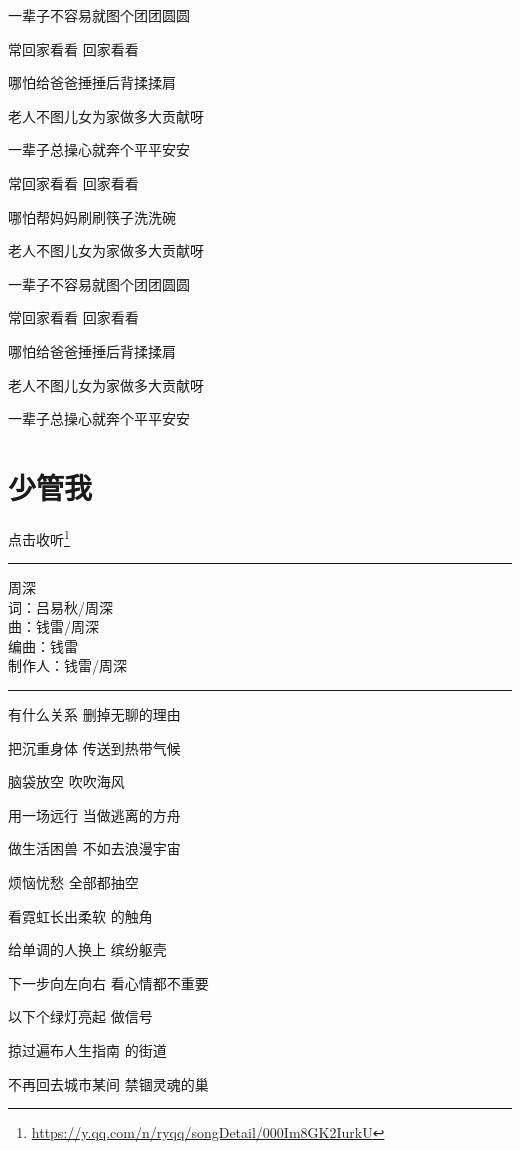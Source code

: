 \documentclass[]{ctexbook}
\renewcommand{\href}[2]{#2\footnote{\url{#1}}}
\begin{document}
一辈子不容易就图个团团圆圆

常回家看看 回家看看

哪怕给爸爸捶捶后背揉揉肩

老人不图儿女为家做多大贡献呀

一辈子总操心就奔个平平安安

常回家看看 回家看看

哪怕帮妈妈刷刷筷子洗洗碗

老人不图儿女为家做多大贡献呀

一辈子不容易就图个团团圆圆

常回家看看 回家看看

哪怕给爸爸捶捶后背揉揉肩

老人不图儿女为家做多大贡献呀

一辈子总操心就奔个平平安安

\section*{少管我}\label{watch-ur-manners}


\href{https://y.qq.com/n/ryqq/songDetail/000Im8GK2IurkU}{点击收听}

\begin{center}\rule{0.5\linewidth}{0.5pt}\end{center}

周深\\
词：吕易秋/周深\\
曲：钱雷/周深\\
编曲：钱雷\\
制作人：钱雷/周深

\begin{center}\rule{0.5\linewidth}{0.5pt}\end{center}

有什么关系 删掉无聊的理由

把沉重身体 传送到热带气候

脑袋放空 吹吹海风

用一场远行 当做逃离的方舟

做生活困兽 不如去浪漫宇宙

烦恼忧愁 全部都抽空

看霓虹长出柔软 的触角

给单调的人换上 缤纷躯壳

下一步向左向右 看心情都不重要

以下个绿灯亮起 做信号

掠过遍布人生指南 的街道

不再回去城市某间 禁锢灵魂的巢
\end{document}
